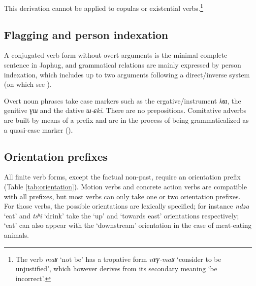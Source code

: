 \documentclass[oneside,a4paper,11pt]{article}
\newcommand{\ipa}[1]{{\phon\textit{#1}}}
\begin{document}
This derivation cannot be applied to copulas or existential verbs.\footnote{The verb \ipa{maʁ} `not be' has a tropative form \ipa{nɤɣ-maʁ} `consider to be unjustified', which however derives from its secondary meaning `be incorrect'.} 

\subsection{Flagging and person indexation}

A conjugated verb form without overt arguments is the minimal complete sentence in Japhug, and grammatical relations are mainly expressed by person indexation, which includes up to two arguments following a direct/inverse system (on which see \citealt{jackson02rentongdengdi, jacques10inverse, gongxun14agreement}).

Overt noun phrases take case markers such as the ergative/instrument \ipa{kɯ}, the genitive \ipa{ɣɯ} and the dative \ipa{ɯ-ɕki}. There are no prepositions. Comitative adverbs are built by means of a prefix and are in the process of being grammaticalized as a quasi-case marker (\citealt{jacques16comitative}).

\subsection{Orientation prefixes} \label{sec:orientation}
All finite verb forms, except the factual non-past, require an orientation prefix (Table \ref{tab:orientation}). Motion verbs and concrete action verbs are compatible with all prefixes, but most verbs can only take one or two orientation prefixes. For those verbs, the possible orientations are lexically specified; for instance \ipa{ndza} `eat' and \ipa{tsʰi} `drink' take the `up' and `towards east' orientations respectively; `eat' can also appear with the `downstream' orientation in the case of meat-eating animals.
\end{document}
